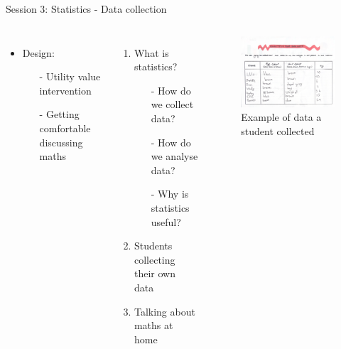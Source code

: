 \documentclass{beamer}  %
\begin{document}
\begin{frame}{Session 3: Statistics - Data collection}
    \begin{columns}
            \begin{itemize}
                \item Design:
                \begin{itemize}
                    \item[-] Utility value intervention
                    \item[-] Getting comfortable discussing maths
                \end{itemize}
            \end{itemize}
            \begin{enumerate}
                \item What is statistics?
                \begin{itemize}
                    \item[-] How do we collect data?
                    \item[-] How do we analyse data?
                    \item[-] Why is statistics useful?
                \end{itemize}
                \item Students collecting their own data         
                \item Talking about maths at home
            \end{enumerate}
            \begin{figure}
                \includegraphics[scale = 0.49]{Images/Collecting_data_example.png}
                \caption{Example of data a student collected}
            \end{figure}
    \end{columns}
        
\end{frame}
\end{document}
